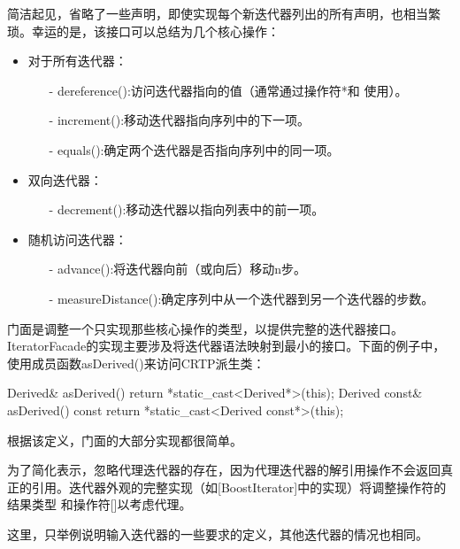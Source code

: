 简洁起见，省略了一些声明，即使实现每个新迭代器列出的所有声明，也相当繁琐。幸运的是，该接口可以总结为几个核心操作：

\begin{itemize}
\item 
对于所有迭代器：
\begin{itemize}
\item [-]
dereference():访问迭代器指向的值（通常通过操作符*和 \inlcpp{->} 使用）。

\item [-]
increment():移动迭代器指向序列中的下一项。

\item [-]
equals():确定两个迭代器是否指向序列中的同一项。
\end{itemize}

\item 
双向迭代器：
\begin{itemize}
\item [-]
decrement():移动迭代器以指向列表中的前一项。
\end{itemize}

\item 
随机访问迭代器：
\begin{itemize}
\item [-]
advance():将迭代器向前（或向后）移动n步。

\item [-]
measureDistance():确定序列中从一个迭代器到另一个迭代器的步数。
\end{itemize}
\end{itemize}

门面是调整一个只实现那些核心操作的类型，以提供完整的迭代器接口。IteratorFacade的实现主要涉及将迭代器语法映射到最小的接口。下面的例子中，使用成员函数asDerived()来访问CRTP派生类：

\begin{cpp}
Derived& asDerived() { return *static_cast<Derived*>(this); }
Derived const& asDerived() const {
	return *static_cast<Derived const*>(this);
}
\end{cpp}

根据该定义，门面的大部分实现都很简单。

\begin{notice}
为了简化表示，忽略代理迭代器的存在，因为代理迭代器的解引用操作不会返回真正的引用。迭代器外观的完整实现（如[BoostIterator]中的实现）将调整操作符的结果类型  和操作符[]以考虑代理。
\end{notice}

这里，只举例说明输入迭代器的一些要求的定义，其他迭代器的情况也相同。

